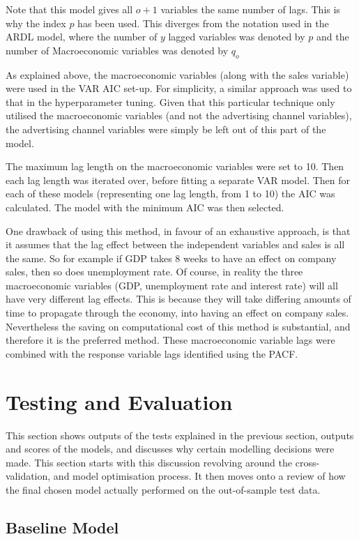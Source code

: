 \documentclass[11pt, a4paper]{article}
\begin{document}
Note that this model gives all $o+1$ variables the same number of lags. This is why the index $p$ has been used. This diverges from the notation used in the ARDL model, where the number of $y$ lagged variables was denoted by $p$ and the number of Macroeconomic variables was denoted by $q_{o}$

As explained above, the macroeconomic variables (along with the sales variable) were used in the VAR AIC set-up. For simplicity, a similar approach was used to that in the hyperparameter tuning. Given that this particular technique only utilised the macroeconomic variables (and not the advertising channel variables), the advertising channel variables were simply be left out of this part of the model. 

The maximum lag length on the macroeconomic variables were set to 10. Then each lag length was iterated over, before fitting a separate VAR model. Then for each of these models (representing one lag length, from 1 to 10) the AIC was calculated. The model with the minimum AIC was then selected. 

One drawback of using this method, in favour of an exhaustive approach, is that it assumes that the lag effect between the independent variables and sales is all the same. So for example if GDP takes 8 weeks to have an effect on company sales, then so does unemployment rate. Of course, in reality the three macroeconomic variables (GDP, unemployment rate and interest rate) will all have very different lag effects. This is because they will take differing amounts of time to propagate through the economy, into having an effect on company sales. Nevertheless the saving on computational cost of this method is substantial, and therefore it is the preferred method. These macroeconomic variable lags were combined with the response variable lags identified using the PACF.


\section{Testing and Evaluation}

This section shows outputs of the tests explained in the previous section, outputs and scores of the models, and discusses why certain modelling decisions were made. This section starts with this discussion revolving around the cross-validation, and model optimisation process. It then moves onto a review of how the final chosen model actually performed on the out-of-sample test data. 

\subsection{Baseline Model}
\end{document}

